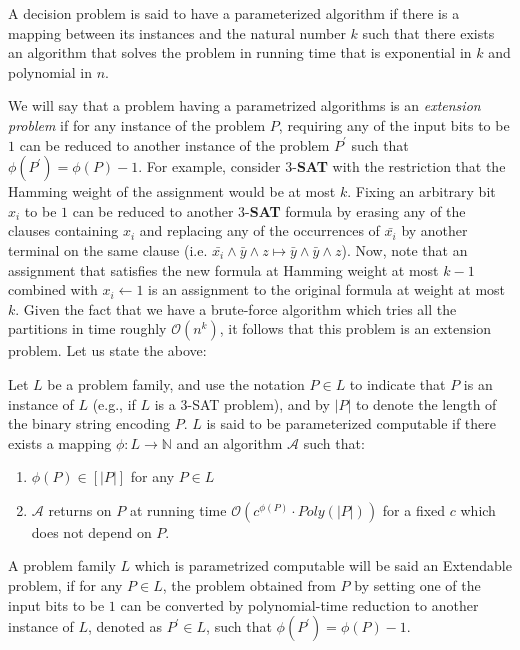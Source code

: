 \documentclass[manuscript,screen,review]{acmart}
\begin{document}
A decision problem is said to have a parameterized algorithm if there is a mapping between its instances and the natural number $k$ such that there exists an algorithm that solves the problem in running time that is exponential in $k$ and polynomial in $n$. 

We will say that a problem having a parametrized algorithms is an \emph{extension problem} if for any instance of the problem $P$, requiring any of the input bits to be $1$ can be reduced to another instance of the problem $P^{\prime}$ such that $\phi\left( P^{\prime} \right) = \phi\left( P \right) - 1$. For example, consider $3$-\textbf{SAT} with the restriction that the Hamming weight of the assignment would be at most $k$. Fixing an arbitrary bit $x_{i}$ to be $1$ can be reduced to another $3$-\textbf{SAT} formula by erasing any of the clauses containing $x_{i}$ and replacing any of the occurrences of $\bar{x_{i}}$ by another terminal on the same clause (i.e. $ \bar{x_{i}} \wedge  \bar{y} \wedge z  \mapsto  \bar{y} \wedge \bar{y} \wedge z$). Now, note that an assignment that satisfies the new formula at Hamming weight at most $k-1$ combined with $x_{i} \leftarrow 1$ is an assignment to the original formula at weight at most $k$. Given the fact that we have a brute-force algorithm which tries all the partitions in time roughly $\mathcal{O}\left( n^{k} \right)$, it follows that this problem is an extension problem. Let us state the above:

\begin{definition} 
Let $L$ be a problem family, and use the notation $P \in L$ to indicate that $P$ is an instance of $L$ (e.g., if $L$ is a $3$-SAT problem), and by $|P|$ to denote the length of the binary string encoding $P$. $L$ is said to be parameterized computable if there exists a mapping $\phi : L \rightarrow \mathbb{N}$ and an algorithm $\mathcal{A}$ such that:

  \begin{enumerate}
    \item $\phi(P) \in [|P|]$ for any $P\in L$
    \item $\mathcal{A}$ returns on $P$ at running time $\mathcal{O}\left(c^{\phi(P)} \cdot Poly(|P|) \right)$ for a fixed $c$ which does not depend on $P$.
  \end{enumerate}
\end{definition}
 
\begin{definition}
	\label{def:ext}
A problem family $L$ which is parametrized computable will be said an Extendable problem, if for any $P \in L$, the problem obtained from $P$ by setting one of the input bits to be $1$ can be converted by polynomial-time reduction to another instance of $L$, denoted as $P^{\prime} \in L$, such that $\phi\left( P^{\prime} \right) = \phi\left( P \right) -1$.
\end{definition}
\end{document}
